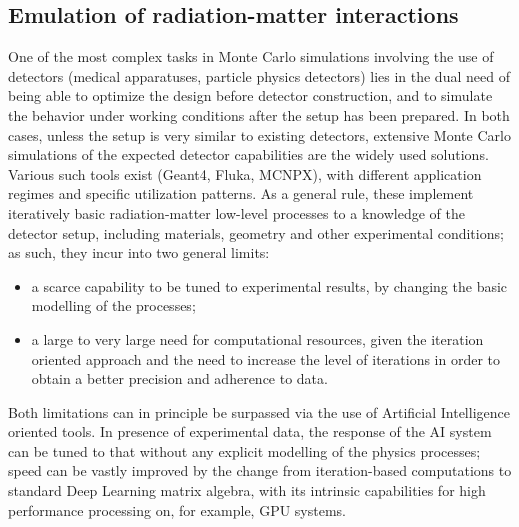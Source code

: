 \subsection{Emulation of radiation-matter interactions}
\label{subsec:interactions}
One of the most complex tasks in Monte Carlo simulations involving the use of detectors (medical apparatuses, particle physics detectors) lies in the dual need of being able to optimize the design before detector construction, and to simulate the behavior under working conditions after the setup has been prepared.
In both cases, unless the setup is very similar to existing detectors, extensive Monte Carlo simulations of the expected detector capabilities are the widely used solutions. Various such tools exist (Geant4\cite{g4}, Fluka\cite{fluka}, MCNPX\cite{MCNPX}), with different application regimes and specific utilization patterns. As a general rule, these implement iteratively basic radiation-matter low-level processes to a knowledge of the detector setup, including materials, geometry and  other experimental conditions; as such, they incur into two general limits:
\begin{itemize}
\item a scarce capability to be tuned to experimental results, by changing the basic modelling of the processes;
\item a large to very large need for computational resources, given the iteration oriented approach and the need to increase the level of iterations in order to obtain a better precision and adherence to data.
\end{itemize}


Both limitations can in principle be surpassed via the use of Artificial Intelligence oriented tools.
In presence of experimental data, the response of the AI system can be tuned to that without any explicit modelling of the physics processes; speed can be vastly improved by the change from iteration-based computations to standard Deep Learning matrix algebra, with its intrinsic capabilities for high performance processing on, for example, GPU systems.

